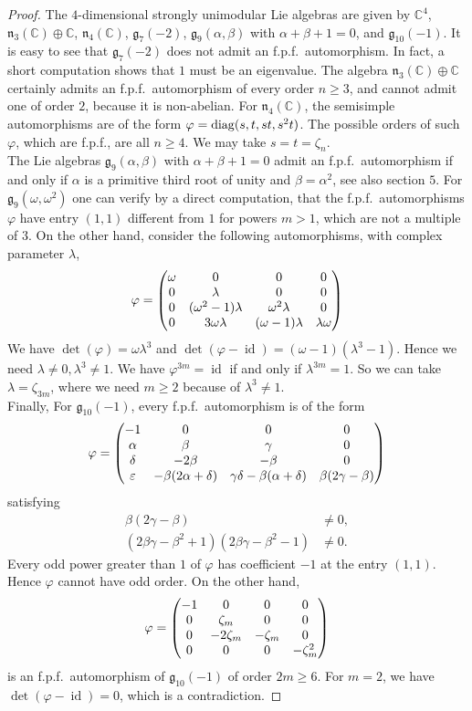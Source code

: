 \documentclass[12pt]{amsart}
\theoremstyle{definition}
\theoremstyle{remark}
\DeclareMathOperator{\id}{id}
\newcommand{\C}{\mathbb{C}}
\newcommand{\diag}{\mathop{\rm diag}}
\newcommand{\Lg}{\mathfrak{g}}
\newcommand{\Ln}{\mathfrak{n}}
\newcommand{\al}{\alpha}
\newcommand{\be}{\beta}
\newcommand{\ga}{\gamma}
\newcommand{\de}{\delta}
\newcommand{\ep}{\varepsilon}
\newcommand{\la}{\lambda}
\newcommand{\om}{\omega}
\renewcommand{\phi}{\varphi}
\begin{document}
\begin{proof}
The $4$-dimensional strongly unimodular Lie algebras are given by $\C^4$, $\Ln_3(\C)\oplus \C$,
$\Ln_4(\C)$, $\Lg_7(-2)$, $\Lg_9(\al,\be)$ with $\al+\be+1=0$, and $\Lg_{10}(-1)$. It is easy to see that
$\Lg_7(-2)$ does not admit an f.p.f.\ automorphism. In fact, a short computation shows that $1$ must be an eigenvalue.
The algebra $\Ln_3(\C)\oplus \C$ certainly admits an f.p.f.\ automorphism of every order $n\ge 3$, and cannot admit
one of order $2$, because it is non-abelian. For $\Ln_4(\C)$, the semisimple automorphisms are of the form
$\phi=\diag (s,t,st,s^2t)$. The possible orders of such $\phi$, which are f.p.f., are all $n\ge 4$. We may
take $s=t=\zeta_n$. \\[0.2cm]
The Lie algebras  $\Lg_9(\al,\be)$ with $\al+\be+1=0$ admit an f.p.f.\ automorphism if and only if $\al$ is a primitive
third root of unity and $\be=\al^2$, see also section $5$. 
For  $\Lg_9(\om,\om^2)$ one can verify by a direct computation, that the f.p.f.\ automorphisms $\phi$
have entry $(1,1)$ different from $1$ for powers $m>1$, which are not a multiple of $3$. On the other hand,
consider the following automorphisms, with complex parameter $\la$,
\[
\phi=\begin{pmatrix} \om & 0 & 0 & 0 \cr 0 & \la & 0 & 0 \cr 0 & (\om^2-1)\la & \om^2\la & 0 \cr
0 & 3\om\la & (\om-1)\la & \la\om
\end{pmatrix}
\]
We have $\det(\phi)=\om\la^3$ and $\det(\phi-\id)=(\om-1)(\la^3-1)$. Hence we need
$\la\neq 0,\la^3\neq 1$. We have $\phi^{3m}=\id$ if and only if $\la^{3m}=1$. So we can take $\la=\zeta_{3m}$, where we need
$m\ge 2$ because of $\la^3\neq 1$. \\[0.2cm]
Finally, For $\Lg_{10}(-1)$, every f.p.f.\ automorphism is of the form
\[
\phi=\begin{pmatrix} -1 & 0 & 0 & 0 \cr \al & \be & \ga & 0 \cr \de & -2\be & -\be & 0 \cr
\ep & -\be(2\al+\de) & \ga\de-\be(\al+\de) & \be(2\ga-\be)
\end{pmatrix}
\]
satisfying
\begin{align*}
\be(2\ga-\be) & \neq 0, \\
(2\be\ga-\be^2+1)(2\be\ga-\be^2-1) & \neq 0.
\end{align*}
Every odd power greater than $1$ of $\phi$ has coefficient $-1$ at the entry $(1,1)$. Hence $\phi$ cannot have odd order.
On the other hand,
\[
\phi=\begin{pmatrix} -1 & 0 & 0 & 0 \cr 0 & \zeta_m & 0 & 0 \cr 0 & -2\zeta_m & -\zeta_m & 0 \cr
0 & 0 & 0 & -\zeta_m^2
\end{pmatrix}
\]
is an f.p.f.\ automorphism of $\Lg_{10}(-1)$ of order $2m\ge 6$. For $m=2$, we have $\det(\phi-\id )=0$, which is
a contradiction.
\end{proof}
\end{document}
